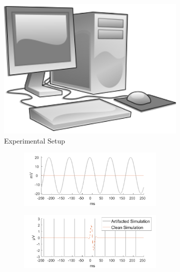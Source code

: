 \documentclass[a4paper]{article}
\begin{document}
\begin{figure}[hbtp]
    \begin{subfigure}{0.245\textwidth}
        \includegraphics[width=\textwidth]{./img/div/desktop_computer.png}
        \caption{Experimental Setup}
    \end{subfigure}
    \begin{subfigure}{0.75\textwidth}
        \begin{subfigure}{.45\textwidth}
            \includegraphics[width=\textwidth]{./img/eva/sim_raw_1.png}
        \end{subfigure}
        \begin{subfigure}{.45\textwidth}
            \includegraphics[width=\textwidth]{./img/eva/sim_raw_2.png}

\end{subfigure}
\end{subfigure}
\end{figure}
\end{document}
